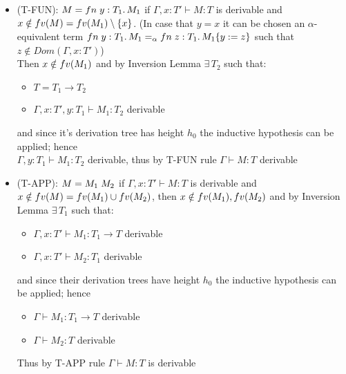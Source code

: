 \begin{itemize}
	\item (T-FUN): $M = fn\;y: T_1.\,M_1$
	      if $\Gamma, x: T' \vdash M: T$ is derivable and $x \notin fv(M) = fv(M_1)\setminus\{x\}$.
	      (In case that $y = x$ it can be chosen an $\alpha$-equivalent term
	      $fn\;y: T_1.\,M_1 =_{\alpha} fn\;z: T_1.\,M_1\{y:=z\}$ such that
	      $z \notin Dom(\Gamma,x: T')$)\\
	      Then $x \notin fv(M_1)$ and by Inversion Lemma $\exists\, T_2$ such that:
	      \begin{itemize}
		      \item $T= T_1 \to T_2$
		      \item $\Gamma, x: T', y: T_1 \vdash M_1: T_2$ derivable
	      \end{itemize}
	      and since it's derivation tree has height $h_0$ the inductive hypothesis can be applied;
	      hence\\ $\Gamma, y: T_1 \vdash M_1: T_2$ derivable, thus by T-FUN rule
	      $\Gamma \vdash M: T$ derivable
	\item (T-APP): $M = M_1\;M_2$
	      if $\Gamma, x: T' \vdash M: T$ is derivable and $x \notin fv(M) = fv(M_1)\cup fv(M_2)$,
	      then $x \notin fv(M_1), fv(M_2)$ and by Inversion Lemma $\exists\, T_1$ such that:
	      \begin{itemize}
		      \item $\Gamma, x: T' \vdash M_1 : T_1 \to T$ derivable
		      \item $\Gamma, x: T' \vdash M_2 : T_1$ derivable
	      \end{itemize}
	      and since their derivation trees have height $h_0$ the inductive hypothesis can be applied;
	      hence
	      \begin{itemize}
		      \item $\Gamma \vdash M_1 : T_1 \to T$ derivable
		      \item $\Gamma \vdash M_2 : T$ derivable
	      \end{itemize}
	      Thus by T-APP rule $\Gamma \vdash M: T$ is derivable
\end{itemize}














